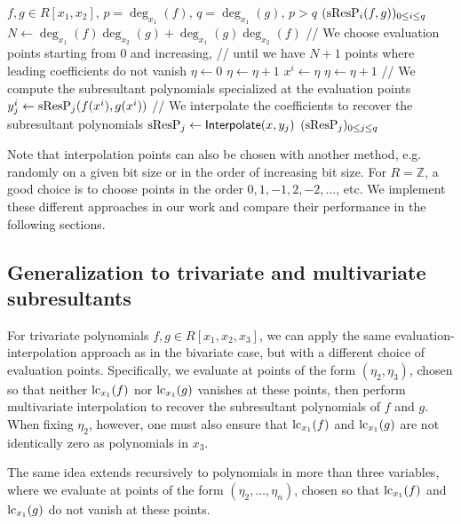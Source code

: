 \begin{algorithm}[ht]
  \caption{\textsf{BivariateSubresultantPolynomials}}\label{alg:res}
  \begin{algorithmic}[1]
    \Require $f,g\in R[x_1,x_2]$, $p=\deg_{x_1}(f)$, $q=\deg_{x_1}(g)$, $p>q$
    \Ensure $(\operatorname{sResP}_i(f,g))_{0\leq i\leq q}$
    \State $N \gets \deg_{x_1}(f)\deg_{x_2}(g)+\deg_{x_1}(g)\deg_{x_2}(f)$
    \State // We choose evaluation points starting from $0$ and increasing,
    \State // until we have $N + 1$ points where leading coefficients do not vanish
    \State $\eta \gets 0$
    \State $\eta \gets \eta + 1$
    \EndWhile
    \State $x^i \gets \eta$
    \State $\eta \gets \eta + 1$
    \EndFor
    \State // We compute the subresultant polynomials specialized at the evaluation points
    \State $y_j^i \gets \operatorname{sResP}_j(f(x^i),g(x^i))$
    \EndFor
    \EndFor
    \State // We interpolate the coefficients to recover the subresultant polynomials
    \State $\operatorname{sResP}_j \gets \textsf{Interpolate}(x, y_j)$
    \EndFor
    \State \Return $(\operatorname{sResP}_j)_{0\leq j\leq q}$
  \end{algorithmic}
\end{algorithm}

Note that interpolation points can also be chosen with another method, e.g. randomly on a given bit size or in the order of increasing bit size. For $R=\mathbb{Z}$, a good choice is to choose points in the order $0, 1, -1, 2, -2, \dots$, etc. We implement these different approaches in our work and compare their performance in the following sections.

\subsection{Generalization to trivariate and multivariate subresultants}

For trivariate polynomials $f,g\in R[x_1,x_2,x_3]$, we can apply the same evaluation-interpolation approach as in the bivariate case, but with a different choice of evaluation points. Specifically, we evaluate at points of the form $(\eta_2,\eta_3)$, chosen so that neither $\operatorname{lc}_{x_1}(f)$ nor $\operatorname{lc}_{x_1}(g)$ vanishes at these points, then perform multivariate interpolation to recover the subresultant polynomials of $f$ and $g$. When fixing $\eta_2$, however, one must also ensure that $\operatorname{lc}_{x_1}(f)$ and $\operatorname{lc}_{x_1}(g)$ are not identically zero as polynomials in $x_3$.

The same idea extends recursively to polynomials in more than three variables, where we evaluate at points of the form $(\eta_2,\dots,\eta_n)$, chosen so that $\operatorname{lc}_{x_1}(f)$ and $\operatorname{lc}_{x_1}(g)$ do not vanish at these points.
